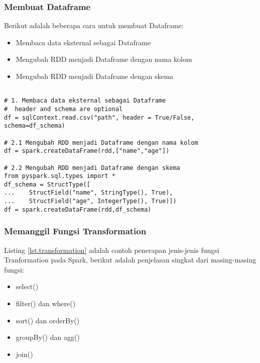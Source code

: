 \subsubsection{Membuat Dataframe}
\noindent Berikut adalah beberapa cara untuk membuat Dataframe:
\begin{itemize}
\item Membaca data eksternal sebagai Dataframe
\item Mengubah RDD menjadi Dataframe dengan nama kolom
\item Mengubah RDD menjadi Dataframe dengan skema
\end{itemize}
\begin{lstlisting}[basicstyle=\ttfamily, frame=single,
	columns=fullflexible, keepspaces=true, breaklines=true, label=ls_kepatuhan_1_1_1_logo_sharif_judge, caption=Cara Pembuatan Dataframe]
	
# 1. Membaca data eksternal sebagai Dataframe
#  header and schema are optional
df = sqlContext.read.csv("path", header = True/False, schema=df_schema)

# 2.1 Mengubah RDD menjadi Dataframe dengan nama kolom
df = spark.createDataFrame(rdd,["name","age"])

# 2.2 Mengubah RDD menjadi Dataframe dengan skema
from pyspark.sql.types import *
df_schema = StructType([
...    StructField("name", StringType(), True),
...    StructField("age", IntegerType(), True)])
df = spark.createDataFrame(rdd,df_schema)

\end{lstlisting}

\newpage
\subsubsection{Memanggil Fungsi Transformation}
\noindent Listing \ref{lst:transformation} adalah contoh penerapan jenis-jenis fungsi Tranformation pada Spark, berikut adalah penjelasan singkat dari masing-masing fungsi:
\begin{itemize}
\item select()
\item filter() dan where()
\item sort() dan orderBy()
\item groupBy() dan agg()
\item join()
\end{itemize}

